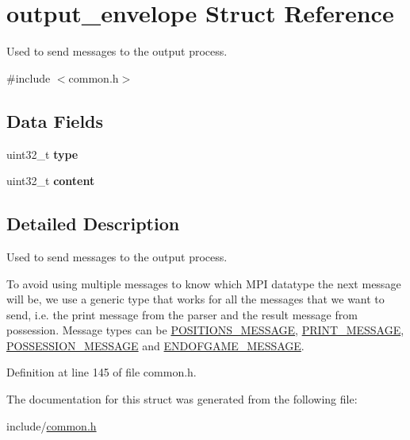 \hypertarget{structoutput__envelope}{}\section{output\+\_\+envelope Struct Reference}
\label{structoutput__envelope}


Used to send messages to the output process.  




{\ttfamily \#include $<$common.\+h$>$}

\subsection*{Data Fields}
\begin{DoxyCompactItemize}
\item 
\mbox{\label{structoutput__envelope_a750e4b5fa22d3a61c559d648d024dba3}} 
uint32\+\_\+t {\bfseries type}
\item 
\mbox{\label{structoutput__envelope_a67cd433143ffcf2adb658b7f95860c11}} 
uint32\+\_\+t {\bfseries content}
\end{DoxyCompactItemize}


\subsection{Detailed Description}
Used to send messages to the output process. 

To avoid using multiple messages to know which M\+PI datatype the next message will be, we use a generic type that works for all the messages that we want to send, i.\+e. the print message from the parser and the result message from possession. Message types can be \mbox{\hyperlink{common_8h_a8da5798ca897bfce113cfdffeb72655f}{P\+O\+S\+I\+T\+I\+O\+N\+S\+\_\+\+M\+E\+S\+S\+A\+GE}}, \mbox{\hyperlink{common_8h_a091cde65311a49ac8f6680864db80171}{P\+R\+I\+N\+T\+\_\+\+M\+E\+S\+S\+A\+GE}}, \mbox{\hyperlink{common_8h_a04f4828ed043e0b47177dfa645656615}{P\+O\+S\+S\+E\+S\+S\+I\+O\+N\+\_\+\+M\+E\+S\+S\+A\+GE}} and \mbox{\hyperlink{common_8h_aa5e8a3ac8d01eeaaf829f70e2c26c5e0}{E\+N\+D\+O\+F\+G\+A\+M\+E\+\_\+\+M\+E\+S\+S\+A\+GE}}. 

Definition at line 145 of file common.\+h.



The documentation for this struct was generated from the following file\+:\begin{DoxyCompactItemize}
\item 
include/\mbox{\hyperlink{common_8h}{common.\+h}}\end{DoxyCompactItemize}
